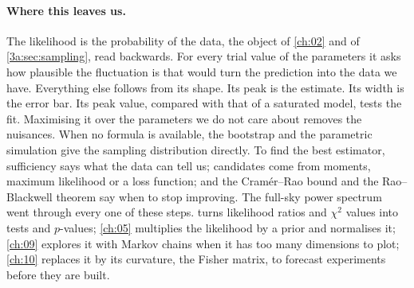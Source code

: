 \paragraph{Where this leaves us.}
The likelihood is the probability of the data, the object of \cref{ch:02}
and of \cref{3a:sec:sampling}, read backwards. For every trial value of the
parameters it asks how plausible the fluctuation is that would turn the
prediction into the data we have. Everything else follows from its shape.
Its peak is the estimate. Its width is the error bar. Its peak value,
compared with that of a saturated model, tests the fit. Maximising it over
the parameters we do not care about removes the nuisances. When no formula
is available, the bootstrap and the parametric simulation give the sampling
distribution directly. To find the best estimator, sufficiency says what the
data can tell us; candidates come from moments, maximum likelihood or a
loss function; and the Cram\'er--Rao bound and the Rao--Blackwell theorem
say when to stop improving. The full-sky power spectrum went through every
one of these steps.  turns likelihood ratios and $\chi^2$ values into
tests and $p$-values; \cref{ch:05} multiplies the likelihood by a prior and
normalises it; \cref{ch:09} explores it with Markov chains when it has too
many dimensions to plot; \cref{ch:10} replaces it by its curvature, the
Fisher matrix, to forecast experiments before they are built.

